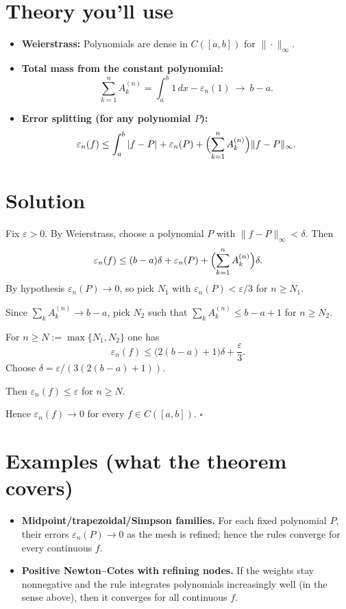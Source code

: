 \documentclass[12pt,a4paper]{article}
\newcommand{\qed}{\hfill$\square$}
\theoremstyle{plain}
\theoremstyle{definition}
\theoremstyle{remark}
\theoremstyle{remark}
\begin{document}
	\bigskip
	
	\section*{Theory you’ll use}
	\begin{itemize}\setlength{\itemsep}{0.6em}
		\item \textbf{Weierstrass:} Polynomials are dense in $C([a,b])$ for $\|\cdot\|_\infty$.
		\item \textbf{Total mass from the constant polynomial:}
		\[
		\sum_{k=1}^n A_k^{(n)}=\int_a^b 1\,dx - \varepsilon_n(1)\ \longrightarrow\ b-a .
		\]
		\item \textbf{Error splitting (for any polynomial $P$):}
		\[
		\varepsilon_n(f)\le \int_a^b |f-P|
		+ \varepsilon_n(P) + \Bigl(\sum_{k=1}^n A_k^{(n)}\Bigr)\|f-P\|_\infty .
		\]
	\end{itemize}
	
	\bigskip
	
	\section*{Solution}
	Fix $\varepsilon>0$.
	By Weierstrass, choose a polynomial $P$ with $\|f-P\|_\infty<\delta$. Then
	\[
	\varepsilon_n(f)\le (b-a)\delta+\varepsilon_n(P)+\Bigl(\sum_{k=1}^n A_k^{(n)}\Bigr)\delta .
	\]
	By hypothesis $\varepsilon_n(P)\to 0$, so pick $N_1$ with $\varepsilon_n(P)<\varepsilon/3$ for $n\ge N_1$.

	Since $\sum_k A_k^{(n)}\to b-a$, pick $N_2$ such that $\sum_k A_k^{(n)}\le b-a+1$ for $n\ge N_2$.

	For $n\ge N:=\max\{N_1,N_2\}$ one has
	\[
	\varepsilon_n(f)\le \bigl(2(b-a)+1\bigr)\delta+\frac{\varepsilon}{3}.
	\]
	Choose $\delta=\varepsilon\big/(3(2(b-a)+1))$.
	
	Then $\varepsilon_n(f)\le \varepsilon$ for $n\ge N$.
	
	Hence $\varepsilon_n(f)\to 0$ for every $f\in C([a,b])$. \qed
	
	\section*{Examples (what the theorem covers)}
	
	\begin{itemize}\setlength{\itemsep}{1em}
		
		\item \textbf{Midpoint/trapezoidal/Simpson families.}  
		For each fixed polynomial $P$, their errors $\varepsilon_n(P)\to 0$ as the mesh is refined;  
		hence the rules converge for every continuous $f$.
		
		\item \textbf{Positive Newton–Cotes with refining nodes.}  
		If the weights stay nonnegative and the rule integrates polynomials increasingly well  
		(in the sense above), then it converges for all continuous $f$.
		
	\end{itemize}
	
\end{document}
